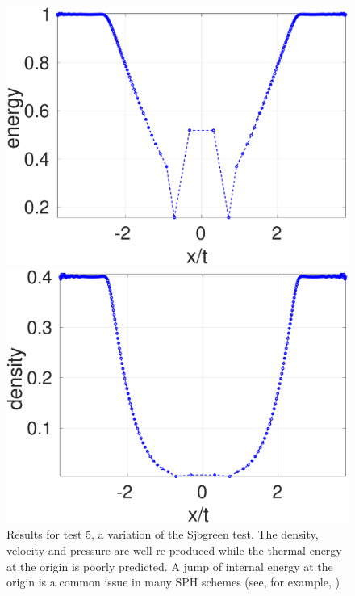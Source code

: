 \begin{figure}
\begin{minipage}{.495\textwidth}
        \includegraphics[width=0.99 \textwidth]{Chapter-4/Figures/Sjogreen/Sjogreen-RCM-e-Adpt1}
    \end{minipage}%
    \begin{minipage}{.495 \textwidth}
        \centering
        \includegraphics[width=0.99 \textwidth]{Chapter-4/Figures/Sjogreen/Sjogreen-RCM-p-Adpt1}
    \end{minipage}%
    \caption{Results for test 5, a variation of the Sj$\ddot{o}$green test. The density, velocity and pressure are well re-produced while the thermal energy at the origin is poorly predicted. A jump of internal energy at the origin is a common issue in many SPH schemes (see, for example, \citep{monaghan1997sph,cha2003implementations,puri2014approximate})}
    \label{fig:RCM-Sjogreen}
\end{figure}

